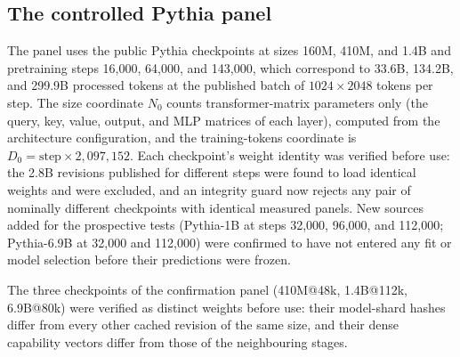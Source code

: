 \subsection{The controlled Pythia panel}
\label{sec:app_pythia}
The panel uses the public Pythia checkpoints at sizes 160M, 410M, and
1.4B and pretraining steps 16{,}000, 64{,}000, and 143{,}000, which
correspond to 33.6B, 134.2B, and 299.9B processed tokens at the
published batch of $1024\times2048$ tokens per step. The size
coordinate $N_0$ counts transformer-matrix parameters only (the query,
key, value, output, and MLP matrices of each layer), computed from the
architecture configuration, and the training-tokens coordinate is
$D_0=\text{step}\times 2{,}097{,}152$. Each checkpoint's weight identity
was verified before use: the 2.8B revisions published for different
steps were found to load identical weights and were excluded, and an
integrity guard now rejects any pair of nominally different checkpoints
with identical measured panels. New sources added for the prospective
tests (Pythia-1B at steps 32{,}000, 96{,}000, and 112{,}000;
Pythia-6.9B at 32{,}000 and 112{,}000) were confirmed to have not
entered any fit or model selection before their predictions were
frozen.

\FloatBarrier
The three checkpoints of the confirmation panel (410M@48k, 1.4B@112k, 6.9B@80k) were verified as distinct weights
before use: their model-shard hashes differ from every other cached revision of the same size, and their dense
capability vectors differ from those of the neighbouring stages.

